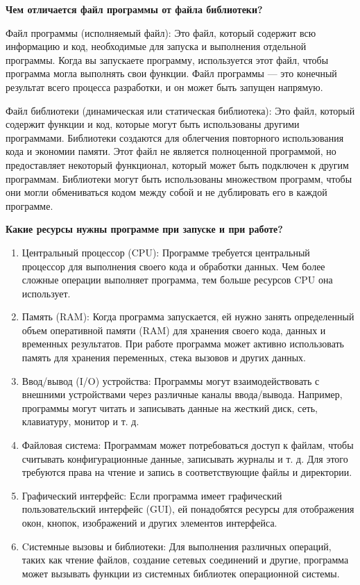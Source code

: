 \documentclass[oneside, final, 14pt]{extreport} %
\begin{document}
\vspace*{\baselineskip}

\textbf{Чем отличается файл программы от файла библиотеки?}

Файл программы (исполняемый файл): Это файл, который содержит всю информацию и код, необходимые для запуска и выполнения отдельной программы. Когда вы запускаете программу, используется этот файл, чтобы программа могла выполнять свои функции. Файл программы --- это конечный результат всего процесса разработки, и он может быть запущен напрямую.

Файл библиотеки (динамическая или статическая библиотека): Это файл, который содержит функции и код, которые могут быть использованы другими программами. Библиотеки создаются для облегчения повторного использования кода и экономии памяти. Этот файл не является полноценной программой, но предоставляет некоторый функционал, который может быть подключен к другим программам. Библиотеки могут быть использованы множеством программ, чтобы они могли обмениваться кодом между собой и не дублировать его в каждой программе.

\vspace*{\baselineskip}

\textbf{Какие ресурсы нужны программе при запуске и при работе?}


\begin{enumerate}
    \item Центральный процессор (CPU): Программе требуется центральный процессор для выполнения своего кода и обработки данных. Чем более сложные операции выполняет программа, тем больше ресурсов CPU она использует.
    \item Память (RAM): Когда программа запускается, ей нужно занять определенный объем оперативной памяти (RAM) для хранения своего кода, данных и временных результатов. При работе программа может активно использовать память для хранения переменных, стека вызовов и других данных.
    \item Ввод/вывод (I/O) устройства: Программы могут взаимодействовать с внешними устройствами через различные каналы ввода/вывода. Например, программы могут читать и записывать данные на жесткий диск, сеть, клавиатуру, монитор и т. д.
    \item Файловая система: Программам может потребоваться доступ к файлам, чтобы считывать конфигурационные данные, записывать журналы и т. д. Для этого требуются права на чтение и запись в соответствующие файлы и директории.
    \item Графический интерфейс: Если программа имеет графический пользовательский интерфейс (GUI), ей понадобятся ресурсы для отображения окон, кнопок, изображений и других элементов интерфейса.
    \item Cистемные вызовы и библиотеки: Для выполнения различных операций, таких как чтение файлов, создание сетевых соединений и другие, программа может вызывать функции из системных библиотек операционной системы.
\end{enumerate}
\end{document}
